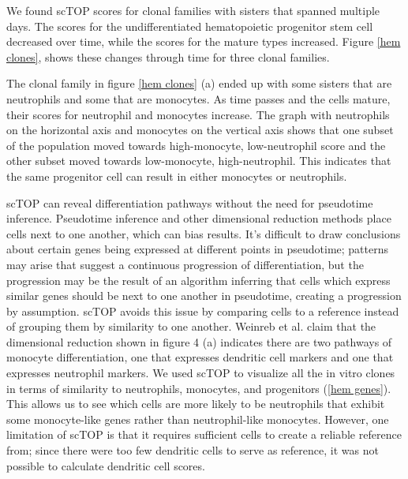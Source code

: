 \documentclass[aps,superscriptaddress, notitlepage,longbibliography]{revtex4-1}
\begin{document}
We found scTOP scores for clonal families with sisters that spanned multiple days. The scores for the undifferentiated hematopoietic progenitor stem cell decreased over time, while the scores for the mature types increased. Figure \ref{hem clones}, shows these changes through time for three clonal families. 

The clonal family in figure \ref{hem clones} (a) ended up with some sisters that are neutrophils and some that are monocytes. As time passes and the cells mature, their scores for neutrophil and monocytes increase. The graph with neutrophils on the horizontal axis and monocytes on the vertical axis shows that one subset of the population moved towards high-monocyte, low-neutrophil score and the other subset moved towards low-monocyte, high-neutrophil. This indicates that the same progenitor cell can result in either monocytes or neutrophils. 

scTOP can reveal differentiation pathways without the need for pseudotime inference. Pseudotime inference and other dimensional reduction methods place cells next to one another, which can bias results. It's difficult to draw conclusions about certain genes being expressed at different points in pseudotime; patterns may arise that suggest a continuous progression of differentiation, but the progression may be the result of an algorithm inferring that cells which express similar genes should be next to one another in pseudotime, creating a progression by assumption. scTOP avoids this issue by comparing cells to a reference instead of grouping them by similarity to one another. Weinreb et al. claim that the dimensional reduction shown in figure 4 (a) indicates there are two pathways of monocyte differentiation, one that expresses dendritic cell markers and one that expresses neutrophil markers. We used scTOP to visualize all the in vitro clones in terms of similarity to neutrophils, monocytes, and progenitors (\ref{hem genes}). This allows us to see which cells are more likely to be neutrophils that exhibit some monocyte-like genes rather than neutrophil-like monocytes. However, one limitation of scTOP is that it requires sufficient cells to create a reliable reference from; since there were too few dendritic cells to serve as reference, it was not possible to calculate dendritic cell scores.
\end{document}
